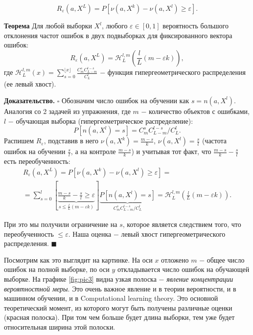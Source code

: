 \begin{equation*}
    R_{\varepsilon}(a, X^L) = P [\nu(a, X^k) - \nu(a, X^l) \geq \varepsilon].
\end{equation*}

\textbf{Теорема} Для любой выборки $X^l$, любого $\varepsilon \in [0, 1]$ вероятность большого отклонения частот ошибок в двух подвыборках для фиксированного вектора ошибок:
$$R_{\varepsilon}(a, X^L)=\mathcal{H}_L^{l, m}(\frac{l}{L}(m-\varepsilon k)),$$
где $\mathcal{H}_L^{l, m}(x)=\sum_{s=0}^{\lfloor x \rfloor}\frac{C_m^s C_{L-m}^{l-s}}{C_L^l}$ $-$ функция гипергеометрического распределения (ее левый хвост).

\textbf{Доказательство.}
$\square$ Обозначим число ошибок на обучении как $s=n(a, X^l)$. Аналогия со 2 задачей из упражнения,  где $m$ $-$ количество объектов с ошибками, $l$ $-$ обучающая выборка (гипергеометрическое распределение):
\begin{equation*}
    P[n(a, X^l)=s]=C_m^s C_{L-m}^{l-s}/C_L^l.
\end{equation*}
Распишем $R_{\varepsilon}$, подставив в него $\nu(a, X^k)=\frac{m-s}{k}$, $\nu(a, X^l)=\frac{s}{l}$ (частота ошибок на обучении $\frac{s}{l}$, а на контроле $\frac{m-s}{k}$) и учитывая тот факт, что $\frac{m-s}{k}-\frac{s}{l}$ есть переобученность:
\begin{multline*}
    R_{\varepsilon}(a, X^L)=P[\nu(a, X^k)-\nu(a, X^l) \geq \varepsilon] = \\
    = \sum_{s=0}^l [\underbrace{\frac{m-s}{k}-\frac{s}{l} \geq \varepsilon}_{s \leq \frac{l}{L}(m-\varepsilon k)}]\underbrace{P[n(a, X^l)=s]}_{C_m^s C_{L-m}^{l-s}/C_L^l}=\mathcal{H}_L^{l, m}(\frac{l}{L}(m-\varepsilon k)).
\end{multline*}

При это мы получили ограничение на $s$, которое является следствием того, что переобученность $\leq \varepsilon$. Наша оценка $-$ левый хвост гипергеометрического распределения.
$\blacksquare$

Посмотрим как это выглядит на картинке. На оси $x$ отложено $m$ $-$ общее число ошибок на полной выборке, по оси $y$ откладывается число ошибок на обучающей выборке. На графике \ref{fig:pic3} видна узкая полоска $-$ \textit{явление концентрации вероятностной меры}. Это очень важное явление и в теории вероятности, и в машинном обучении, и в Computational learning theory. Это основной теоретический момент, из которого могут быть получены различные оценки (красная полоска). При том чем больше будет длина выборки, тем уже будет относительная ширина этой полоски.

